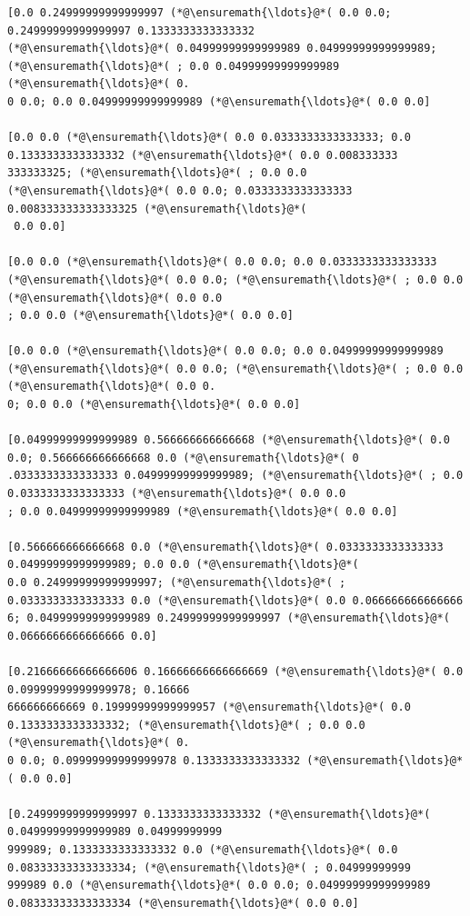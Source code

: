 \documentclass[12pt,a4paper]{article}
\begin{document}
\begin{lstlisting}
[0.0 0.24999999999999997 (*@\ensuremath{\ldots}@*( 0.0 0.0; 0.24999999999999997 0.1333333333333332 
(*@\ensuremath{\ldots}@*( 0.04999999999999989 0.04999999999999989; (*@\ensuremath{\ldots}@*( ; 0.0 0.04999999999999989 (*@\ensuremath{\ldots}@*( 0.
0 0.0; 0.0 0.04999999999999989 (*@\ensuremath{\ldots}@*( 0.0 0.0]

[0.0 0.0 (*@\ensuremath{\ldots}@*( 0.0 0.0333333333333333; 0.0 0.1333333333333332 (*@\ensuremath{\ldots}@*( 0.0 0.008333333
333333325; (*@\ensuremath{\ldots}@*( ; 0.0 0.0 (*@\ensuremath{\ldots}@*( 0.0 0.0; 0.0333333333333333 0.008333333333333325 (*@\ensuremath{\ldots}@*(
 0.0 0.0]

[0.0 0.0 (*@\ensuremath{\ldots}@*( 0.0 0.0; 0.0 0.0333333333333333 (*@\ensuremath{\ldots}@*( 0.0 0.0; (*@\ensuremath{\ldots}@*( ; 0.0 0.0 (*@\ensuremath{\ldots}@*( 0.0 0.0
; 0.0 0.0 (*@\ensuremath{\ldots}@*( 0.0 0.0]

[0.0 0.0 (*@\ensuremath{\ldots}@*( 0.0 0.0; 0.0 0.04999999999999989 (*@\ensuremath{\ldots}@*( 0.0 0.0; (*@\ensuremath{\ldots}@*( ; 0.0 0.0 (*@\ensuremath{\ldots}@*( 0.0 0.
0; 0.0 0.0 (*@\ensuremath{\ldots}@*( 0.0 0.0]

[0.04999999999999989 0.566666666666668 (*@\ensuremath{\ldots}@*( 0.0 0.0; 0.566666666666668 0.0 (*@\ensuremath{\ldots}@*( 0
.0333333333333333 0.04999999999999989; (*@\ensuremath{\ldots}@*( ; 0.0 0.0333333333333333 (*@\ensuremath{\ldots}@*( 0.0 0.0
; 0.0 0.04999999999999989 (*@\ensuremath{\ldots}@*( 0.0 0.0]

[0.566666666666668 0.0 (*@\ensuremath{\ldots}@*( 0.0333333333333333 0.04999999999999989; 0.0 0.0 (*@\ensuremath{\ldots}@*( 
0.0 0.24999999999999997; (*@\ensuremath{\ldots}@*( ; 0.0333333333333333 0.0 (*@\ensuremath{\ldots}@*( 0.0 0.066666666666666
6; 0.04999999999999989 0.24999999999999997 (*@\ensuremath{\ldots}@*( 0.0666666666666666 0.0]

[0.21666666666666606 0.16666666666666669 (*@\ensuremath{\ldots}@*( 0.0 0.09999999999999978; 0.16666
666666666669 0.19999999999999957 (*@\ensuremath{\ldots}@*( 0.0 0.1333333333333332; (*@\ensuremath{\ldots}@*( ; 0.0 0.0 (*@\ensuremath{\ldots}@*( 0.
0 0.0; 0.09999999999999978 0.1333333333333332 (*@\ensuremath{\ldots}@*( 0.0 0.0]

[0.24999999999999997 0.1333333333333332 (*@\ensuremath{\ldots}@*( 0.04999999999999989 0.04999999999
999989; 0.1333333333333332 0.0 (*@\ensuremath{\ldots}@*( 0.0 0.08333333333333334; (*@\ensuremath{\ldots}@*( ; 0.04999999999
999989 0.0 (*@\ensuremath{\ldots}@*( 0.0 0.0; 0.04999999999999989 0.08333333333333334 (*@\ensuremath{\ldots}@*( 0.0 0.0]


\end{lstlisting}
\end{document}
